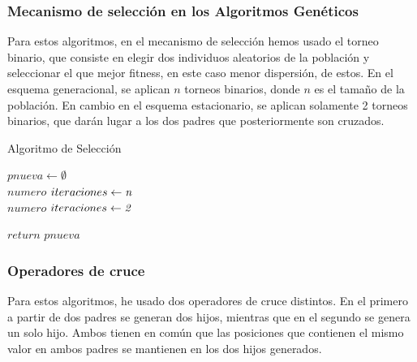 \documentclass{article}
\begin{document}
\subsubsection{\small Mecanismo de selección en los Algoritmos Genéticos}
Para estos algoritmos, en el mecanismo de selección hemos usado el torneo binario, que 
consiste en elegir dos individuos aleatorios de la población y seleccionar el que 
mejor fitness, en este caso menor dispersión, de estos.
En el esquema generacional, se aplican $n$ torneos binarios, donde $n$ es el tamaño de la población.
En cambio en el esquema estacionario, se aplican solamente 2 torneos binarios, que darán lugar a los dos
padres que posteriormente son cruzados.

\begin{algorithm}[H]
  \scriptsize
  \label{Algoritmo de Seleccion}
  \caption{Algoritmo de Selección}
\vspace{3mm}

$pnueva \leftarrow \emptyset $\\
{
  $numero$ $iteraciones \leftarrow \emph{n}$\\  
}{
  $numero$ $iteraciones \leftarrow \emph{2}$\\
}
\vspace{3mm}

$return$ $pnueva $\\
\end{algorithm}


\subsubsection{\small Operadores de cruce}
Para estos algoritmos, he usado dos operadores de cruce distintos.
En el primero a partir de dos padres se generan dos hijos, mientras que en 
el segundo se genera un solo hijo.
Ambos tienen en común que las posiciones que contienen el mismo valor en ambos padres se mantienen 
en los dos hijos generados.
\end{document}
